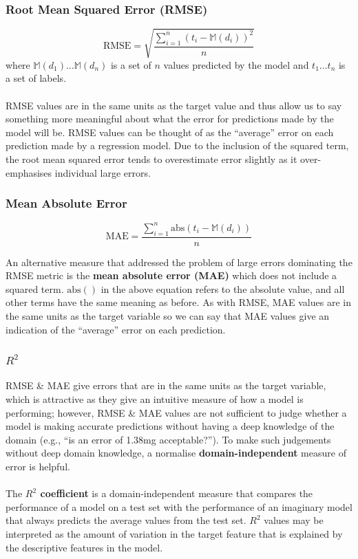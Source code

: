 \documentclass[a4paper,11pt]{article}
\begin{document}
\subsubsection{Root Mean Squared Error (RMSE)}
\[
    \text{RMSE} = \sqrt{ \frac{\sum^n_{i=1} \left( t_i - \mathbb{M}(d_i) \right)^2 }{n} }
\]
where $\mathbb{M}(d_1) \dots \mathbb{M}(d_n)$ is a set of $n$ values predicted by the model and $t_1 \dots t_n$ is a set of labels.
\\\\
RMSE values are in the same units as the target value and thus allow us to say something more meaningful about what the error for predictions made by the model will be.
RMSE values can be thought of as the ``average'' error on each prediction made by a regression model.
Due to the inclusion of the squared term, the root mean squared error tends to overestimate error slightly as it over-emphasises individual large errors.

\subsubsection{Mean Absolute Error}
\[
    \text{MAE} = \frac{ \sum^n_{i=1} \text{abs} \left( t_i - \mathbb{M}(d_i) \right)}{n}
\]

An alternative measure that addressed the problem of large errors dominating the RMSE metric is the \textbf{mean absolute error (MAE)} which does not include a squared term.
$\text{abs}()$ in the above equation refers to the absolute value, and all other terms have the same meaning as before.
As with RMSE, MAE values are in the same units as the target variable so we can say that MAE values give an indication of the ``average'' error on each prediction.

\subsubsection{$R^2$}
RMSE \& MAE give errors that are in the same units as the target variable, which is attractive as they give an intuitive measure of how a model is performing; however, RMSE \& MAE values are not sufficient to judge whether a model is making accurate predictions without having a deep knowledge of the domain (e.g., ``is an error of 1.38mg acceptable?'').
To make such judgements without deep domain knowledge, a normalise \textbf{domain-independent} measure of error is helpful.
\\\\
The \textbf{$R^2$ coefficient} is a domain-independent measure that compares the performance of a model on a test set with the performance of an imaginary model that always predicts the average values from the test set.
$R^2$ values may be interpreted as the amount of variation in the target feature that is explained by the descriptive features in the model.
\end{document}
